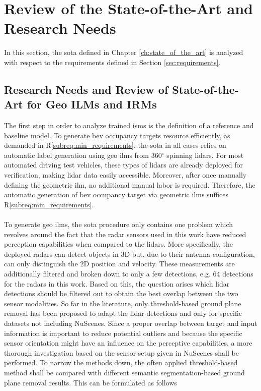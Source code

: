\section{Review of the State-of-the-Art and Research Needs}
\label{sec:research_needs}
In this section, the \gls{sota} defined in Chapter \ref{ch:state_of_the_art} is analyzed with respect to the requirements defined in Section \ref{sec:requirements}.
%
\subsection{Research Needs and Review of State-of-the-Art for Geo ILMs and IRMs}
\label{subsec:research_needs_for_geo_ilms_n_irms}
The first step in order to analyze trained \gls{ism}s is the definition of a reference and baseline model. To generate \gls{bev} occupancy targets resource efficiently, as demanded in R\ref{subreq:min_requirements}, the \gls{sota} in all cases relies on automatic label generation using geo \gls{ilm}s from 360$^\circ$ spinning lidars. For most automated driving test vehicles, these types of lidars are already deployed for verification, making lidar data easily accessible. Moreover, after once manually defining the geometric \gls{ilm}, no additional manual labor is required. Therefore, the automatic generation of \gls{bev} occupancy target via geometric \gls{ilm}s suffices R\ref{subreq:min_requirements}.
\\\\
To generate geo \gls{ilm}s, the \gls{sota} procedure only contains one problem which revolves around the fact that the radar sensors used in this work have reduced perception capabilities when compared to the lidars. More specifically, the deployed radars can detect objects in 3D but, due to their antenna configuration, can only distinguish the 2D position and velocity. These measurements are additionally filtered and broken down to only a few detections, e.g. 64 detections for the radars in this work. Based on this, the question arises which lidar detections should be filtered out to obtain the best overlap between the two sensor modalities. So far in the literature, only threshold-based ground plane removal has been proposed to adapt the lidar detections and only for specific datasets not including NuScenes. Since a proper overlap between target and input information is important to reduce potential outliers and because the specific sensor orientation might have an influence on the perceptive capabilities, a more thorough investigation based on the sensor setup given in NuScenes shall be performed. To narrow the methods down, the often applied threshold-based method shall be compared with different semantic segmentation-based ground plane removal results. This can be formulated as follows
